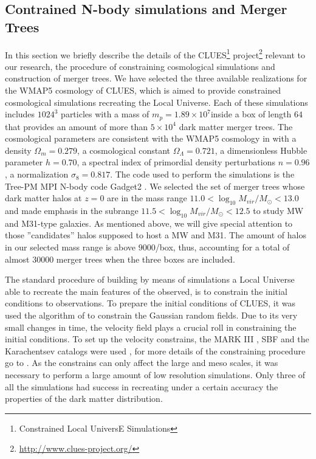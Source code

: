\documentclass[usenatbib]{mn2e}
\newcommand{\hMpc}{{\ifmmode{h^{-1}{\rm Mpc}}\else{$h^{-1}$Mpc }\fi}}
\newcommand{\hMsun}{{\ifmmode{h^{-1}{\rm {M_{\odot}}}}\else{$h^{-1}{\rm{M_{\odot}}}$}\fi}}
\begin{document}
\subsection{Contrained N-body simulations and Merger Trees}
\label{sec:simulations}
In this section we briefly describe the details of the CLUES\footnote{Constrained Local UniversE Simulations} project\footnote{\url{http://www.clues-project.org/}} relevant to our
research, the procedure of constraining cosmological simulations and construction of merger trees. 
We have selected the three available realizations for the WMAP5 cosmology of CLUES, which is aimed to provide constrained cosmological simulations recreating the Local Universe. Each of 
these simulations includes $1024^3$ particles with a mass of $m_{p}=1.89\times 10^{7}$\hMsun inside a box of length $64$\hMpc  that provides an amount of more than $5\times 10^4$ 
dark matter merger trees. The cosmological parameters are consistent with the WMAP5 cosmology in  \cite{2009ApJS..180..330K} with a density $\Omega_{m}=0.279$, a cosmological
constant $\Omega_{\Lambda} = 0.721$, a dimensionless Hubble parameter $h=0.70$, a spectral index of primordial density perturbations $n=0.96$, a normalization $\sigma_{8}=0.817$.  
The code used to perform the simulations is the Tree-PM MPI N-body code Gadget2 \citep{2005MNRAS.364.1105S}. We selected 
the set of merger trees whose dark matter halos at $z=0$ are in the mass range $11.0<\log_{10} M_{vir}/M_{\odot}<13.0$ and made  emphasis in the subrange 
$11.5<\log_{10} M_{vir}/M_{\odot}<12.5$ to study MW and M31-type galaxies.  As mentioned above, we will give special attention to those ''candidates'' halos  supposed to host a MW
 and M31. The amount of halos in our selected mass range  is above $9000$/box, thus, accounting for a total of almost $30000$ merger trees when the three boxes are included.


The standard procedure of building by means of simulations a Local Universe able to recreate the main features of the observed, is to constrain the initial conditions
to observations. To prepare the initial conditions of CLUES, it was used the algorithm of \cite{1991ApJ...380L...5H}   to constrain the Gaussian random fields. Due to
its very small changes in time, the velocity field plays a crucial roll in constraining the initial conditions. To set up the velocity constrains, the MARK
  III \citep{1997ApJS..109..333W}, SBF \citep{2001ApJ...546..681T} and the Karachentsev \citep{2004AJ....127.2031K} catalogs were used \citep{2011arXiv1107.0017F},
for more details of the constraining procedure go to \cite{2010arXiv1005.2687G}. As the constrains can only affect the large and meso scales, it was necessary to 
perform a large amount of low resolution simulations. Only three of all the simulations had success in recreating under a certain accuracy the properties
of the dark matter distribution.
\end{document}
